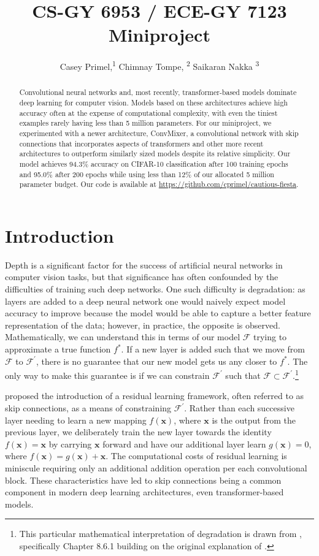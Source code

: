 \documentclass[letterpaper]{article} %
\title{CS-GY 6953 / ECE-GY 7123 Miniproject}
\author {
    Casey Primel,\textsuperscript{\rm 1}
    Chimnay Tompe, \textsuperscript{\rm 2}
    Saikaran Nakka \textsuperscript{\rm 3}
}
\begin{document}
\maketitle

\begin{abstract}
Convolutional neural networks and, most recently, transformer-based models dominate deep learning for computer vision. Models based on these architectures achieve high accuracy often at the expense of computational complexity, with even the tiniest examples rarely having less than 5 million parameters. For our miniproject, we experimented with a newer architecture, ConvMixer, a convolutional network with skip connections that incorporates aspects of transformers and other more recent architectures to outperform similarly sized models despite its relative simplicity. Our model achieves 94.3\% accuracy on CIFAR-10 classification after 100 training epochs and 95.0\% after 200 epochs while using less than 12\% of our allocated 5 million parameter budget. Our code is available at \url{https://github.com/cprimel/cautious-fiesta}.
\end{abstract}

\section{Introduction}

Depth is a significant factor for the success of artificial neural networks in computer vision tasks, but that significance has often confounded by the difficulties of training such deep networks. One such difficulty is degradation: as layers are added to a deep neural network one would naively expect model accuracy to improve because the model would be able to capture a better feature representation of the data; however, in practice, the opposite is observed. Mathematically, we can understand this in terms of our model $\mathcal{F}$ trying to approximate a true function $f^*$. If a new layer is added such that we move from $\mathcal{F}$ to $\mathcal{F}^\prime$, there is no guarantee that our new model gets us any closer to $f^*$. The only way to make this guarantee is if we can constrain $\mathcal{F}^\prime$ such that $\mathcal{F} \subset \mathcal{F}^\prime$.\footnote{This particular mathematical interpretation of degradation is drawn from \citet{Zhang2021}, specifically Chapter 8.6.1 building on the original explanation of \citet{He2015}.}

\citet{He2015} proposed the introduction of a residual learning framework, often referred to as skip connections, as a means of constraining $\mathcal{F}^\prime$. Rather than each successive layer needing to learn a new mapping $f(\mathbf{x})$, where $\mathbf{x}$ is the output from the previous layer, we deliberately train the new layer towards the identity $f(\mathbf{x})=\mathbf{x}$ by carrying $\mathbf{x}$ forward and have our additional layer learn $g(\mathbf{x}) = 0$, where $f(\mathbf{x})= g(\mathbf{x}) + \mathbf{x}$. The computational costs of residual learning is miniscule requiring only an additional addition operation per each convolutional block. These characteristics have led to skip connections being a common component in modern deep learning architectures, even transformer-based models. 
\end{document}
